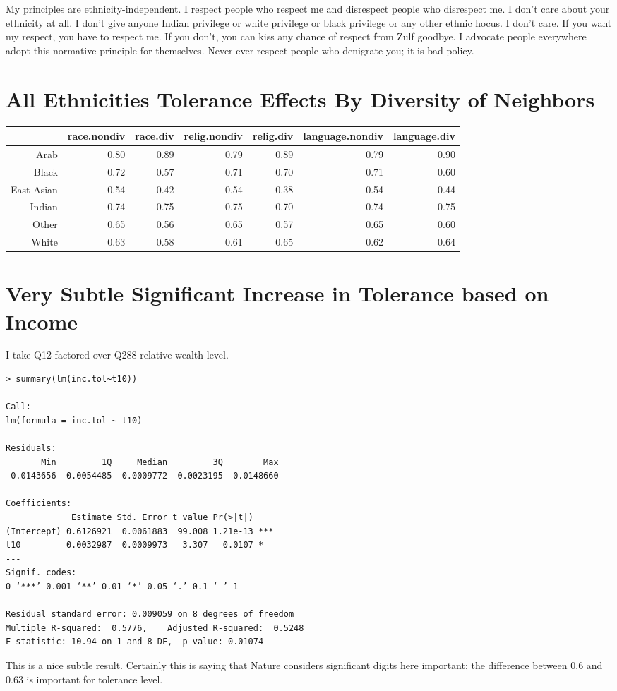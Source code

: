 \documentclass{amsart}
\begin{document}
My principles are ethnicity-independent.  I respect people who respect me and disrespect people who disrespect me.  I don't care about your ethnicity at all.  I don't give anyone Indian privilege or white privilege or black privilege or any other ethnic hocus.  I don't care.  If you want my respect, you have to respect me.  If you don't, you can kiss any chance of respect from Zulf goodbye.  I advocate people everywhere adopt this normative principle for themselves.  Never ever respect people who denigrate you; it is bad policy.

\section{All Ethnicities Tolerance Effects By Diversity of Neighbors}

\begin{table}[ht]
\centering
\begin{tabular}{rrrrrrr}
  \hline
 & race.nondiv & race.div & relig.nondiv & relig.div & language.nondiv & language.div \\ 
  \hline
Arab & 0.80 & 0.89 & 0.79 & 0.89 & 0.79 & 0.90 \\ 
  Black & 0.72 & 0.57 & 0.71 & 0.70 & 0.71 & 0.60 \\ 
  East Asian & 0.54 & 0.42 & 0.54 & 0.38 & 0.54 & 0.44 \\ 
  Indian & 0.74 & 0.75 & 0.75 & 0.70 & 0.74 & 0.75 \\ 
  Other & 0.65 & 0.56 & 0.65 & 0.57 & 0.65 & 0.60 \\ 
  White & 0.63 & 0.58 & 0.61 & 0.65 & 0.62 & 0.64 \\ 
   \hline
\end{tabular}
\end{table}

\section{Very Subtle Significant Increase in Tolerance based on Income}

I take Q12 factored over Q288 relative wealth level.

\begin{verbatim}
> summary(lm(inc.tol~t10))

Call:
lm(formula = inc.tol ~ t10)

Residuals:
       Min         1Q     Median         3Q        Max 
-0.0143656 -0.0054485  0.0009772  0.0023195  0.0148660 

Coefficients:
             Estimate Std. Error t value Pr(>|t|)    
(Intercept) 0.6126921  0.0061883  99.008 1.21e-13 ***
t10         0.0032987  0.0009973   3.307   0.0107 *  
---
Signif. codes:  
0 ‘***’ 0.001 ‘**’ 0.01 ‘*’ 0.05 ‘.’ 0.1 ‘ ’ 1

Residual standard error: 0.009059 on 8 degrees of freedom
Multiple R-squared:  0.5776,	Adjusted R-squared:  0.5248 
F-statistic: 10.94 on 1 and 8 DF,  p-value: 0.01074
\end{verbatim}

This is a nice subtle result.  Certainly this is saying that Nature considers significant digits here important; the difference between 0.6 and 0.63 is important for tolerance level.
\end{document}
